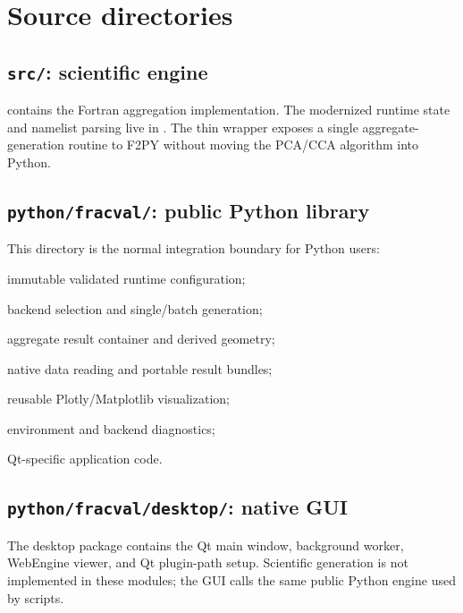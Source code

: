 \documentclass[11pt,oneside]{report}
\begin{document}
\section{Source directories}

\subsection{\texttt{src/}: scientific engine}

 contains the Fortran aggregation implementation. The modernized
runtime state and namelist parsing live in . The thin wrapper
 exposes a single aggregate-generation routine to
F2PY without moving the PCA/CCA algorithm into Python.

\subsection{\texttt{python/fracval/}: public Python library}

This directory is the normal integration boundary for Python users:
\begin{description}[leftmargin=3.1cm,style=nextline]
  \item[\path{config.py}] immutable validated runtime configuration;
  \item[\path{engine.py}] backend selection and single/batch generation;
  \item[\path{aggregate.py}] aggregate result container and derived geometry;
  \item[\path{io.py}] native data reading and portable result bundles;
  \item[\path{visualization.py}] reusable Plotly/Matplotlib visualization;
  \item[\path{diagnostics.py}] environment and backend diagnostics;
  \item[\path{desktop/}] Qt-specific application code.
\end{description}

\subsection{\texttt{python/fracval/desktop/}: native GUI}

The desktop package contains the Qt main window, background worker, WebEngine
viewer, and Qt plugin-path setup. Scientific generation is not implemented in
these modules; the GUI calls the same public Python engine used by scripts.
\end{document}
